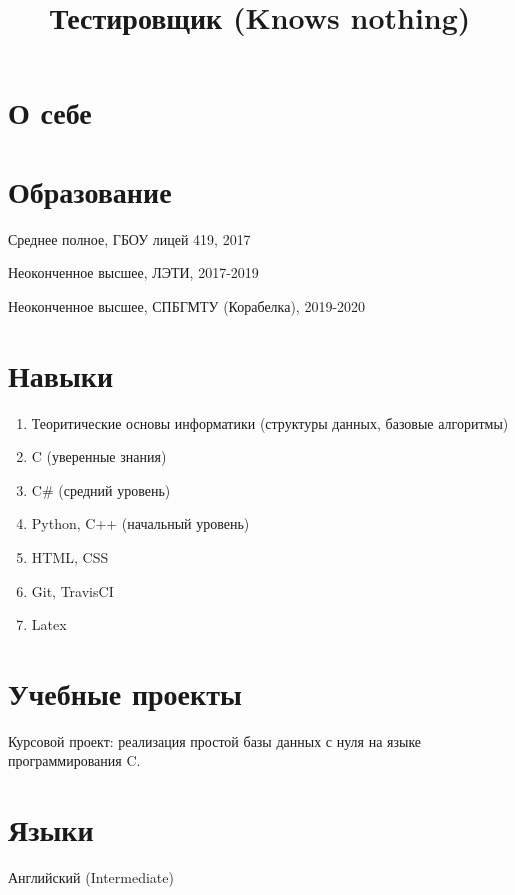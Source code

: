 \documentclass[11pt,a4paper]{moderncv}
\title{Тестировщик (Knows nothing)}
\begin{document}
\maketitle

\section{О себе} %
\section{Образование}
Среднее полное, ГБОУ лицей 419, 2017

Неоконченное высшее, ЛЭТИ, 2017-2019

Неоконченное высшее, СПБГМТУ (Корабелка), 2019-2020


\section{Навыки}
\begin{enumerate}
    \item Теоритические основы информатики (структуры данных, базовые алгоритмы)
    \item C (уверенные знания)
    \item C\# (средний уровень)
    \item Python, C++ (начальный уровень)
    \item HTML, CSS
    \item Git, TravisCI
    \item Latex
\end{enumerate}

\section{Учебные проекты}
Курсовой проект: реализация простой базы данных с нуля на языке программирования C.
\section{Языки}
Английский (Intermediate)
 
\end{document}
